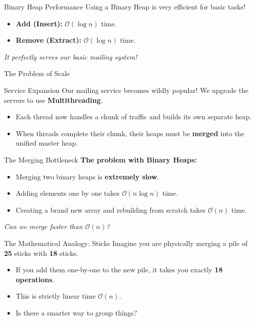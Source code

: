 \documentclass[11pt, aspectratio=169]{beamer}
\begin{document}
\begin{frame}{Binary Heap Performance}
    Using a Binary Heap is very efficient for basic tasks!
    \vspace{0.3cm}
    \begin{itemize}
        \item \textbf{Add (Insert):} $\mathcal{O}(\log n)$ time.
        \item \textbf{Remove (Extract):} $\mathcal{O}(\log n)$ time.
    \end{itemize}
    \vspace{0.3cm}
    \textit{It perfectly serves our basic mailing system!}
\end{frame}

\begin{frame}{The Problem of Scale}
    \begin{alertblock}{Service Expansion}
        Our mailing service becomes wildly popular! We upgrade the servers to use \textbf{Multithreading}.
    \end{alertblock}
    \vspace{0.5cm}
    \begin{itemize}
        \item Each thread now handles a chunk of traffic and builds its own separate heap.
        \item When threads complete their chunk, their heaps must be \textbf{merged} into the unified master heap.
    \end{itemize}
\end{frame}

\begin{frame}{The Merging Bottleneck}
    \textbf{The problem with Binary Heaps:}
    \vspace{0.3cm}
    \begin{itemize}
        \item Merging two binary heaps is \textbf{extremely slow}.
        \item Adding elements one by one takes $\mathcal{O}(n \log n)$ time.
        \item Creating a brand new array and rebuilding from scratch takes $\mathcal{O}(n)$ time.
    \end{itemize}
    \vspace{0.5cm}
    \textit{Can we merge faster than $\mathcal{O}(n)$?}
\end{frame}

\begin{frame}{The Mathematical Analogy: Sticks}
    Imagine you are physically merging a pile of \textbf{25} sticks with \textbf{18} sticks.
    \vspace{0.5cm}
    \begin{itemize}
        \item If you add them one-by-one to the new pile, it takes you exactly \textbf{18 operations}.
        \item This is strictly linear time $\mathcal{O}(n)$.
        \item Is there a smarter way to group things?
    \end{itemize}
\end{frame}
\end{document}

